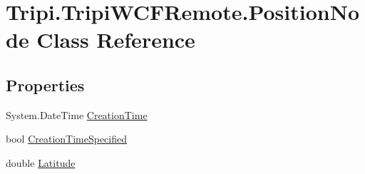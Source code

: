 \hypertarget{class_tripi_1_1_tripi_w_c_f_remote_1_1_position_node}{
\section{Tripi.TripiWCFRemote.PositionNode Class Reference}
\label{class_tripi_1_1_tripi_w_c_f_remote_1_1_position_node}
}


 
\subsection*{Properties}
\begin{DoxyCompactItemize}
\item 
\hypertarget{class_tripi_1_1_tripi_w_c_f_remote_1_1_position_node_a37d9802945560a595bc585dab9bb1a7f}{
System.DateTime \hyperlink{class_tripi_1_1_tripi_w_c_f_remote_1_1_position_node_a37d9802945560a595bc585dab9bb1a7f}{CreationTime}}
\label{class_tripi_1_1_tripi_w_c_f_remote_1_1_position_node_a37d9802945560a595bc585dab9bb1a7f}

\begin{DoxyCompactList}\small\item\em \item\end{DoxyCompactList}\item 
\hypertarget{class_tripi_1_1_tripi_w_c_f_remote_1_1_position_node_aba0a6e9935e0b6767f96284ead02c1fc}{
bool \hyperlink{class_tripi_1_1_tripi_w_c_f_remote_1_1_position_node_aba0a6e9935e0b6767f96284ead02c1fc}{CreationTimeSpecified}}
\label{class_tripi_1_1_tripi_w_c_f_remote_1_1_position_node_aba0a6e9935e0b6767f96284ead02c1fc}

\begin{DoxyCompactList}\small\item\em \item\end{DoxyCompactList}\item 
\hypertarget{class_tripi_1_1_tripi_w_c_f_remote_1_1_position_node_aa2d43ec4445af2e3e6918a9ae6b5acab}{
double \hyperlink{class_tripi_1_1_tripi_w_c_f_remote_1_1_position_node_aa2d43ec4445af2e3e6918a9ae6b5acab}{Latitude}}
\label{class_tripi_1_1_tripi_w_c_f_remote_1_1_position_node_aa2d43ec4445af2e3e6918a9ae6b5acab}


\end{DoxyCompactItemize}
